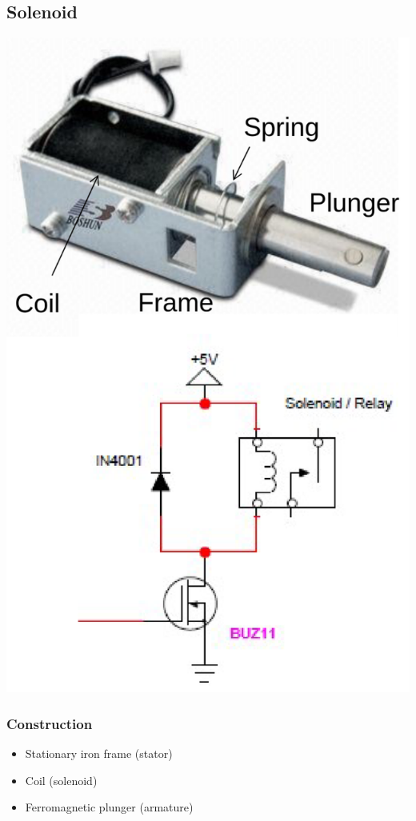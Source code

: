 \documentclass[11pt]{article}
\begin{document}
\subsection{Solenoid}
\label{sec:org5f19cdd}
\begin{center}
\includegraphics[scale=0.6]{./images/solenoid-diagram.png}
\end{center}
\subsubsection{Construction}
\label{sec:orge93fc22}
\begin{itemize}
\item Stationary iron frame (stator)
\item Coil (solenoid)
\item Ferromagnetic plunger (armature)
\end{itemize}
\end{document}
